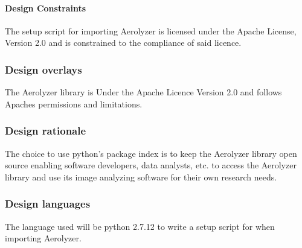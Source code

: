 \documentclass[onecolumn, draftclsnofoot,10pt, compsoc]{IEEEtran}
\begin{document}
\begin{singlespace}
          \paragraph{Design Constraints}
          The setup script for importing Aerolyzer is licensed under the Apache License, Version 2.0 and is constrained to the compliance of said licence. 
      \subsubsection{Design overlays}
      		The Aerolyzer library is Under the Apache Licence Version 2.0 and follows Apaches permissions and limitations.
      \subsubsection{Design rationale}
      		The choice to use python’s package index is to keep the Aerolyzer library open source enabling software developers, data analysts, etc. to access the Aerolyzer library and use its image analyzing software for their own research needs. 
      \subsubsection{Design languages}
      The language used will be python 2.7.12 to write a setup script for when importing Aerolyzer.

\end{singlespace}
\end{document}
